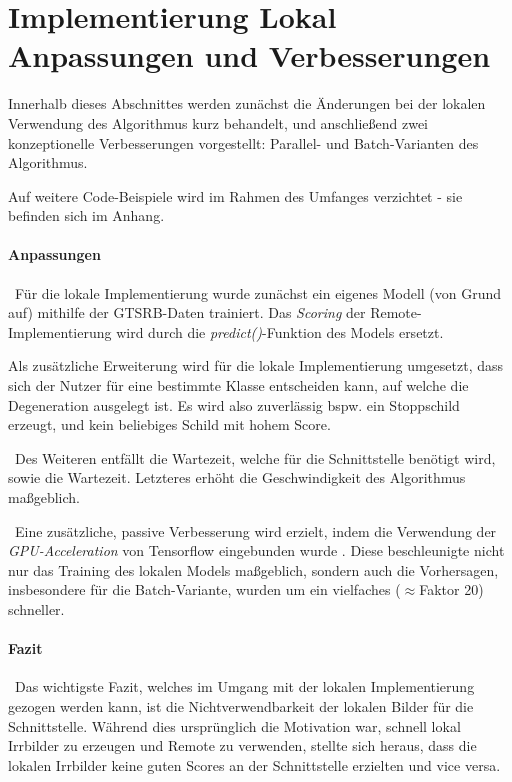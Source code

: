 \section[Implementierung Lokal]{Implementierung Lokal \newline Anpassungen und Verbesserungen}
\label{sec:DegenerationLokal}

Innerhalb dieses Abschnittes werden zunächst die Änderungen bei der lokalen Verwendung des Algorithmus kurz behandelt, und anschließend zwei konzeptionelle Verbesserungen vorgestellt: Parallel- und Batch-Varianten des Algorithmus. 

Auf weitere Code-Beispiele wird im Rahmen des Umfanges verzichtet - sie befinden sich im Anhang.

\paragraph{Anpassungen} ~\newline Für die lokale Implementierung wurde zunächst ein eigenes Modell (von Grund auf) mithilfe der \ac{GTSRB}-Daten trainiert. Das \textit{Scoring} der Remote-Implementierung wird durch die \textit{predict()}-Funktion des Models ersetzt.

Als zusätzliche Erweiterung wird für die lokale Implementierung umgesetzt, dass sich der Nutzer für eine bestimmte Klasse entscheiden kann, auf welche die Degeneration ausgelegt ist. Es wird also zuverlässig bspw. ein Stoppschild erzeugt, und kein beliebiges Schild mit hohem Score. 

~\newline Des Weiteren entfällt die Wartezeit, welche für die Schnittstelle benötigt wird, sowie die Wartezeit. Letzteres erhöht die Geschwindigkeit des Algorithmus maßgeblich. 

~\newline Eine zusätzliche, passive Verbesserung wird erzielt, indem die Verwendung der \textit{GPU-Acceleration} von Tensorflow eingebunden wurde . Diese beschleunigte nicht nur das Training des lokalen Models maßgeblich, sondern auch die Vorhersagen, insbesondere für die Batch-Variante, wurden um ein vielfaches ($\approx$Faktor 20) schneller.  

\paragraph{Fazit}~\newline Das wichtigste Fazit, welches im Umgang mit der lokalen Implementierung gezogen werden kann, ist die Nichtverwendbarkeit der lokalen Bilder für die Schnittstelle. Während dies ursprünglich die Motivation war, schnell lokal Irrbilder zu erzeugen und Remote zu verwenden, stellte sich heraus, dass die lokalen Irrbilder keine guten Scores an der Schnittstelle erzielten und vice versa. 

